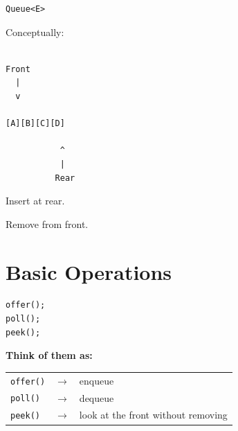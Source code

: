 \documentclass[11pt,a4paper]{book}
\begin{document}
\begin{verbatim} 
Queue<E>
\end{verbatim}
\newpage
Conceptually:

\begin{verbatim}

Front
  |
  v

[A][B][C][D]

           ^
           |
          Rear

\end{verbatim}


Insert at rear.


Remove from front.








\section{Basic Operations}

\begin{verbatim}
offer();
poll();
peek();
\end{verbatim}

\medskip

\textbf{Think of them as:}

\begin{center}
\renewcommand{\arraystretch}{1.4}
\begin{tabular}{@{}lcl@{}}
\textcolor{RosettaBlue}{\texttt{offer()}} & $\rightarrow$ & enqueue \\

\textcolor{RosettaBlue}{\texttt{poll()}} & $\rightarrow$ & dequeue \\

\textcolor{RosettaBlue}{\texttt{peek()}} & $\rightarrow$ & look at the front without removing
\end{tabular}
\end{center}
\end{document}

